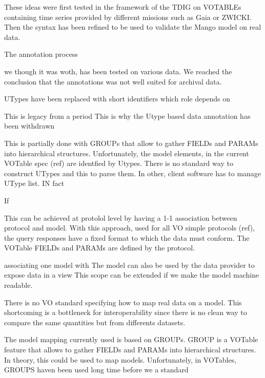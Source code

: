 \documentclass[11pt,a4paper]{ivoa}
\begin{document}
These ideas were first tested in the framework of the TDIG on VOTABLEs containing time series provided by different missions such as Gaia or ZWICKI. Then the syntax has been refined to be used to validate the Mango model on real data.

\iffalse
 The annotation process 

we though it was woth, has been tested on various data. We reached the conclusion that the annotations was not well suited for archival data.

 

 UTypes have been replaced with short identifiers which role depends on 


This is legacy from a period 
This is why the Utype based data annotation has been withdrawn

This is partially done with GROUPs that allow to gather FIELDs and PARAMs into hierarchical structures. Unfortunately, the model elements, in the current VOTable spec (ref) are identfied by Utypes. There is no standard way to construct UTypes and this to parse them. In other, client software has to manage UType list. IN fact 

If  


This can be achieved at protolol level by having a 1-1 association between protocol and  model. With this approach, used for all VO simple protocols (ref), the query responses have a fixed format to which the data must conform. The VOTable FIELDs and PARAMs are defined by the protocol.


associating one model with
The model can also be used by the data provider to expose data in a view
This scope can be extended if we make the model machine readable.


There is no VO standard specifying how to map real data on a model. 
This shortcoming is a bottleneck for interoperability since there is no clean way to compare the same quantities but from differents datasets. 


The model mapping currently used is based on GROUPs. GROUP is a VOTable feature that allows to gather FIELDs and PARAMs into hierarchical structures. In theory, this could be used to map models. Unfortunately, in VOTables, GROUPS haven been used long time before we a standard  
\end{document}
